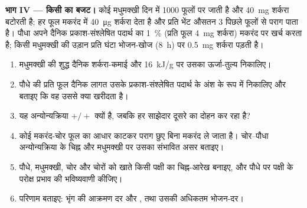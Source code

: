 \begin{problem}
\medskip
\noindent\textbf{भाग IV --- किसी  का बजट।}
कोई मधुमक्खी दिन में 1000 फूलों पर जाती है और \qty{40}{mg} शर्करा बटोरती
है; हर फूल मकरंद में \qty{40}{\micro g} शर्करा देता है और प्रति भेंट
औसतन 3 पिछले फूलों से पराग पाता है। पौधा अपने दैनिक प्रकाश-संश्लेषित
पदार्थ का \qty{1}{\%} (प्रति फूल \qty{4}{mg} शर्करा) मकरंद पर खर्च करता
है; किसी मधुमक्खी की उड़ान प्रति घंटा भोजन-खोज (\qty{8}{h}) पर
\qty{0.5}{mg} शर्करा पड़ती है।
\begin{enumerate}[resume]
  \item मधुमक्खी की शुद्ध दैनिक शर्करा-कमाई और \qty{16}{kJ/g} पर उसका
        ऊर्जा-तुल्य निकालिए।
  \item पौधे की प्रति फूल दैनिक लागत उसके प्रकाश-संश्लेषित पदार्थ के
        अंश के रूप में निकालिए और बताइए कि वह उससे क्या खरीदता है।
  \item यह अन्योन्यक्रिया $+/+$ क्यों है, जबकि हर साझेदार दूसरे का
        दोहन कर रहा है?
  \item कोई मकरंद-चोर फूल का आधार काटकर पराग छुए बिना मकरंद ले जाता है।
        चोर--पौधा अन्योन्यक्रिया के चिह्न और मधुमक्खी पर उसका संभावित
        असर बताइए।
  \item पौधे, मधुमक्खी, चोर और चोरों को खाते किसी पक्षी का चिह्न-आरेख
        बनाइए, और पौधे पर पक्षी के परोक्ष प्रभाव की भविष्यवाणी कीजिए।
  \item परिणाम बताइए: भृंग की आक्रमण दर और , तथा उसकी अधिकतम
        भोजन-दर।
\end{enumerate}
\end{problem}
